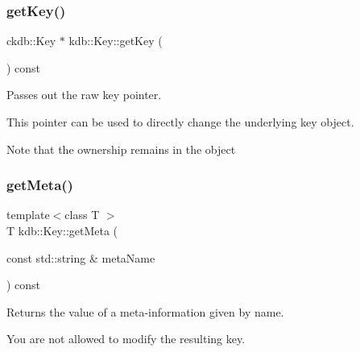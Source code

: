\subsubsection{\texorpdfstring{getKey()}{getKey()}}
{\footnotesize\ttfamily ckdb\+::\+Key $\ast$ kdb\+::\+Key\+::get\+Key (\begin{DoxyParamCaption}{ }\end{DoxyParamCaption}) const\hspace{0.3cm}{\ttfamily [inline]}}



Passes out the raw key pointer. 

This pointer can be used to directly change the underlying key object.

\begin{DoxyNote}{Note}
that the ownership remains in the object 
\end{DoxyNote}
\mbox{\label{classkdb_1_1Key_acdd4e81b0565756c99826bf926fd6fe4}} 
\subsubsection{\texorpdfstring{getMeta()}{getMeta()}}
{\footnotesize\ttfamily template$<$class T $>$ \\
T kdb\+::\+Key\+::get\+Meta (\begin{DoxyParamCaption}\item[{const std\+::string \&}]{meta\+Name }\end{DoxyParamCaption}) const\hspace{0.3cm}{\ttfamily [inline]}}



Returns the value of a meta-\/information given by name. 

You are not allowed to modify the resulting key.


\begin{DoxyCode}{0}
\DoxyCodeLine{\{}
\DoxyCodeLine{        \{}
\DoxyCodeLine{                \textcolor{comment}{// the type of the key is boolean}}
\DoxyCodeLine{        \}}
\DoxyCodeLine{\}}
\end{DoxyCode}


